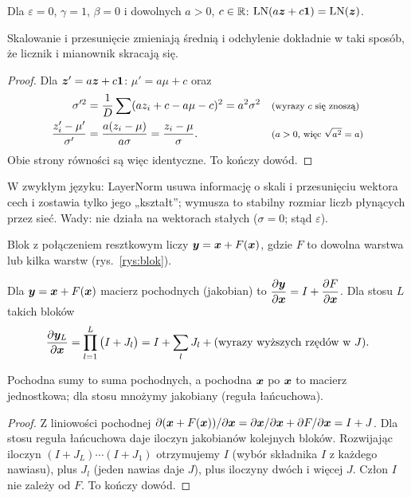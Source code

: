 \begin{twierdzenie}\label{tw:ln}
Dla $\varepsilon=0$, $\gamma=1$, $\beta=0$ i dowolnych $a>0$, $c\in\mathbb{R}$: $\operatorname{LN}(a\bm{z}+c\bm{1})=\operatorname{LN}(\bm{z})$.
\end{twierdzenie}
\begin{pomyslDowodu}
Skalowanie i przesunięcie zmieniają średnią i odchylenie dokładnie w taki sposób, że licznik i mianownik skracają się.
\end{pomyslDowodu}
\begin{proof}
Dla $\bm{z}'=a\bm{z}+c\bm{1}$: $\mu'=a\mu+c$ oraz
\begin{align*}
\sigma'^2 &= \frac1D\sum(az_i+c-a\mu-c)^2=a^2\sigma^2 && \text{\footnotesize (wyrazy $c$ się znoszą)}\\
\frac{z'_i-\mu'}{\sigma'} &= \frac{a(z_i-\mu)}{a\sigma}=\frac{z_i-\mu}{\sigma}. && \text{\footnotesize ($a>0$, więc $\sqrt{a^2}=a$)}
\end{align*}
Obie strony równości są więc identyczne. To kończy dowód.
\end{proof}

W zwykłym języku: LayerNorm usuwa informację o skali i przesunięciu wektora cech i zostawia tylko jego „kształt”; wymusza to stabilny rozmiar liczb płynących przez sieć. Wady: nie działa na wektorach stałych ($\sigma=0$; stąd $\varepsilon$).

\begin{definicja}\label{def:residual}
Blok z połączeniem resztkowym liczy $\bm{y}=\bm{x}+F(\bm{x})$, gdzie $F$ to dowolna warstwa lub kilka warstw (rys.~\ref{rys:blok}).
\end{definicja}

\begin{twierdzenie}\label{tw:residual}
Dla $\bm{y}=\bm{x}+F(\bm{x})$ macierz pochodnych (jakobian) to $\dfrac{\partial\bm{y}}{\partial\bm{x}}=I+\dfrac{\partial F}{\partial\bm{x}}$. Dla stosu $L$ takich bloków
\begin{equation}
  \frac{\partial\bm{y}_L}{\partial\bm{x}}=\prod_{l=1}^{L}\big(I+J_l\big)=I+\sum_{l}J_l+(\text{wyrazy wyższych rzędów w }J).
\end{equation}
\end{twierdzenie}
\begin{pomyslDowodu}
Pochodna sumy to suma pochodnych, a pochodna $\bm{x}$ po $\bm{x}$ to macierz jednostkowa; dla stosu mnożymy jakobiany (reguła łańcuchowa).
\end{pomyslDowodu}
\begin{proof}
Z liniowości pochodnej $\partial(\bm{x}+F(\bm{x}))/\partial\bm{x}=\partial\bm{x}/\partial\bm{x}+\partial F/\partial\bm{x}=I+J$. Dla stosu reguła łańcuchowa daje iloczyn jakobianów kolejnych bloków. Rozwijając iloczyn $(I+J_L)\cdots(I+J_1)$ otrzymujemy $I$ (wybór składnika $I$ z każdego nawiasu), plus $J_l$ (jeden nawias daje $J$), plus iloczyny dwóch i więcej $J$. Człon $I$ nie zależy od $F$. To kończy dowód.
\end{proof}

